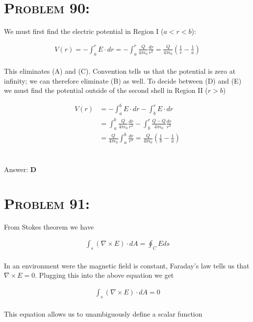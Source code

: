 \documentclass{article}
\begin{document}

\section{\textsc{Problem 90:}} We must first find the electric potential in Region I ($a < r < b$):

\begin{align}
V(r) = - \int_{a}^{r} E \cdot dr = - \int_{a}^{r} \frac{Q}{4 \pi \epsilon_{0}} \frac{dr}{r^{2}} = \boxed{\frac{Q}{4 \pi \epsilon_{0}} \left(  \frac{1}{r} - \frac{1}{a} \right)}\nonumber
\end{align}
\\
This eliminates (A) and (C). Convention tells us that the potential is zero at infinity; we can therefore eliminate (B) as well. To decide between (D) and (E) we must find the potential outside of the second shell in Region II ($r > b$)

\begin{align}
V(r) &= - \int_{a}^{b} E \cdot dr  - \int_{b}^{r} E \cdot dr \nonumber\\
&= \int_{a}^{b} \frac{Q}{4 \pi \epsilon_{0}} \frac{dr}{r^{2}} - \int_{b}^{r} \frac{Q - Q}{4 \pi \epsilon_{0}} \frac{dr}{r^{2}} \nonumber\\
&= \frac{Q}{4 \pi \epsilon_{0}} \int_{a}^{b}  \frac{dr}{r^{2}} = \boxed{\frac{Q}{4 \pi \epsilon_{0}} \left(  \frac{1}{b} - \frac{1}{a} \right)}\nonumber
\end{align}
\\\\
Answer: \textbf{\textcolor{ProcessBlue}D}\\


\section{\textsc{Problem 91:}} From Stokes theorem we have

\begin{align}
\int_{s} (\nabla \times E) \cdot dA = \oint_{C} E ds
\end{align}
\\
In an environment were the magnetic field is constant, Faraday's law tells us that $\nabla \times E = 0$. Plugging this into the above equation we get

\begin{align}
\int_{s} (\nabla \times E) \cdot dA = 0\nonumber
\end{align}
\\
This equation allows us to unambiguously define a scalar function
\end{document}
